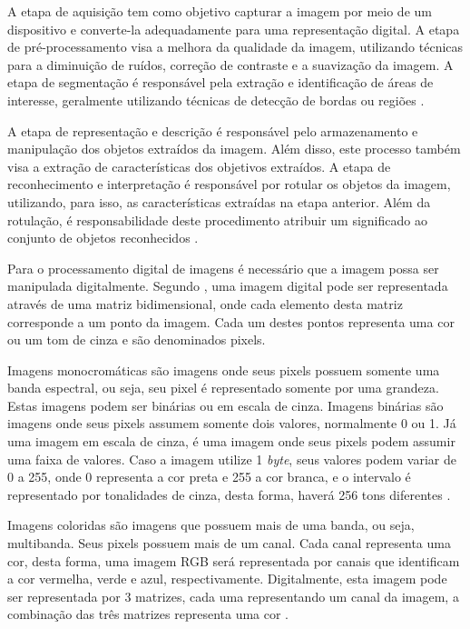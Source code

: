 \documentclass[
	12pt,				%
	oneside,			%
	a4paper,			%
	english,			%
	french,				%
	spanish,			%
	brazil,				%
	]{abntex2}
\begin{document}
A etapa de aquisição tem como objetivo capturar a imagem por meio de um dispositivo e converte-la adequadamente para uma representação digital. A etapa de pré-processamento visa a melhora da qualidade da imagem, utilizando técnicas para a diminuição de ruídos, correção de contraste e a suavização da imagem. A etapa de segmentação é responsável pela extração e identificação de áreas de interesse, geralmente utilizando técnicas de detecção de bordas ou regiões \cite{pedriniSchwartz:2008}.

A etapa de representação e descrição é responsável pelo armazenamento e manipulação dos objetos extraídos da imagem. Além disso, este processo também visa a extração de características dos objetivos extraídos. A etapa de reconhecimento e interpretação é responsável por rotular os objetos da imagem, utilizando, para isso, as características extraídas na etapa anterior. Além da rotulação, é responsabilidade deste procedimento atribuir um significado ao conjunto de objetos reconhecidos \cite{pedriniSchwartz:2008}. 

Para o processamento digital de imagens é necessário que a imagem possa ser manipulada digitalmente. Segundo \citet{pedriniSchwartz:2008}, uma imagem digital pode ser representada através de uma matriz bidimensional, onde cada elemento desta matriz corresponde a um ponto da imagem. Cada um destes pontos representa uma cor ou um tom de cinza e são denominados pixels. 

Imagens monocromáticas são imagens onde seus pixels possuem somente uma banda espectral, ou seja, seu pixel é representado somente por uma grandeza. Estas imagens podem ser binárias ou em escala de cinza. Imagens binárias são imagens onde seus pixels assumem somente dois valores, normalmente 0 ou 1. Já uma imagem em escala de cinza, é uma imagem onde seus pixels podem assumir uma faixa de valores. Caso a imagem utilize 1 \textit{byte}, seus valores podem variar de 0 a 255, onde 0 representa a cor preta e 255 a cor branca, e o intervalo é representado por tonalidades de cinza, desta forma, haverá 256 tons diferentes \cite{conciAzevedoLeta:2008}.

Imagens coloridas são imagens que possuem mais de uma banda, ou seja, multibanda. Seus pixels possuem mais de um canal. Cada canal representa uma cor, desta forma, uma imagem RGB será representada por canais que identificam a cor vermelha, verde e azul, respectivamente. Digitalmente, esta imagem pode ser representada por 3 matrizes, cada uma representando um canal da imagem, a combinação das três matrizes representa uma cor \cite{conciAzevedoLeta:2008}.
\end{document}
